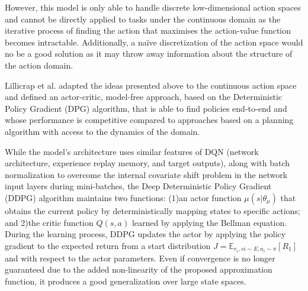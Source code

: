 However, this model is only able to handle discrete low-dimensional action spaces and cannot be directly applied to tasks under the continuous domain as the iterative process of finding the action that maximises the action-value function becomes intractable. Additionally, a na\"{i}ve discretization of the action space would no be a good solution as it may throw away information about the structure of the action domain.

Lillicrap et al. \cite{lillicrap2015continuous} adapted the ideas presented above to the continuous action space and defined an actor-critic, model-free approach, based on the Deterministic Policy Gradient \cite{Silver2014} (DPG) algorithm, that is able to find policies end-to-end and whose performance is competitive compared to approaches based on a planning algorithm with access to the dynamics of the domain. 

While the model's architecture uses similar features of DQN (network architecture, experience replay memory, and target outputs), along with batch normalization \cite{ioffe2015batch} to overcome the internal covariate shift problem in the network input layers during mini-batches, the Deep Deterministic Policy Gradient (DDPG) algorithm maintains two functions: (1)an actor function $\mu(s|\theta_{\mu})$ that obtains the current policy by deterministically mapping states to specific actions; and 2)the critic function $Q(s,a)$ learned by applying the Bellman equation. During the learning process, DDPG updates the actor by applying the policy gradient to the expected return from a start distribution $J = \mathbb{E}_{r_i, si \sim E, a_i \sim \pi}[R_1]$ and with respect to the actor parameters. Even if convergence is no longer guaranteed due to the added non-linearity of the proposed approximation function, it produces a good generalization over large state spaces.

